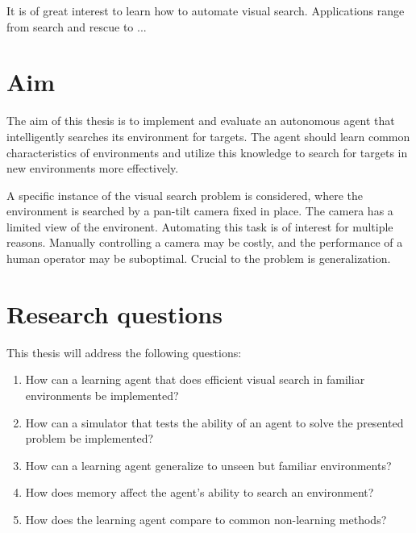 It is of great interest to learn how to automate visual search. Applications range from search and rescue to ...




\section{Aim}
\label{sec:aim}

The aim of this thesis is to implement and evaluate an autonomous agent that intelligently searches its environment for targets. The agent should learn common characteristics of environments and utilize this knowledge to search for targets in new environments more effectively.

A specific instance of the visual search problem is considered, where the environment is searched by a pan-tilt camera fixed in place. The camera has a limited view of the environent. Automating this task is of interest for multiple reasons. Manually controlling a camera may be costly, and the performance of a human operator may be suboptimal. Crucial to the problem is generalization.

\section{Research questions}
\label{sec:research-questions}

This thesis will address the following questions:

\begin{enumerate}
  \item How can a learning agent that does efficient visual search in familiar environments be implemented?
  \item How can a simulator that tests the ability of an agent to solve the presented problem be implemented?
  \item How can a learning agent generalize to unseen but familiar environments?
  \item How does memory affect the agent's ability to search an environment?
  \item How does the learning agent compare to common non-learning methods?
\end{enumerate}

